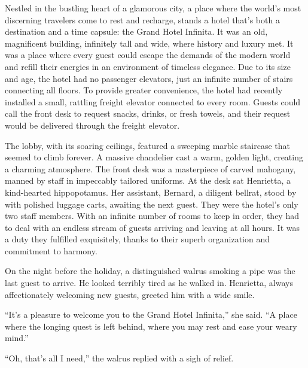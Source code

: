Nestled in the bustling heart of a glamorous city, a place where the world's most discerning travelers come to rest and recharge, stands a hotel that's both a destination and a time capsule: the Grand Hotel Infinita. It was an old, magnificent building, infinitely tall and wide, where history and luxury met. It was a place where every guest could escape the demands of the modern world and refill their energies in an environment of timeless elegance. Due to its size and age, the hotel had no passenger elevators, just an infinite number of stairs connecting all floors. To provide greater convenience, the hotel had recently installed a small, rattling freight elevator connected to every room. Guests could call the front desk to request snacks, drinks, or fresh towels, and their request would be delivered through the freight elevator.

The lobby, with its soaring ceilings, featured a sweeping marble staircase that seemed to climb forever. A massive chandelier cast a warm, golden light, creating a charming atmosphere. The front desk was a masterpiece of carved mahogany, manned by staff in impeccably tailored uniforms. At the desk sat Henrietta, a kind-hearted hippopotamus. Her assistant, Bernard, a diligent bellrat, stood by with polished luggage carts, awaiting the next guest. They were the hotel's only two staff members. With an infinite number of rooms to keep in order, they had to deal with an endless stream of guests arriving and leaving at all hours. It was a duty they fulfilled exquisitely, thanks to their superb organization and commitment to harmony.

\clearpage


On the night before the holiday, a distinguished walrus smoking a pipe was the last guest to arrive. He looked terribly tired as he walked in. Henrietta, always affectionately welcoming new guests, greeted him with a wide smile.

``It's a pleasure to welcome you to the Grand Hotel Infinita,'' she said. ``A place where the longing quest is left behind, where you may rest and ease your weary mind.'' 

``Oh, that's all I need,'' the walrus replied with a sigh of relief.

